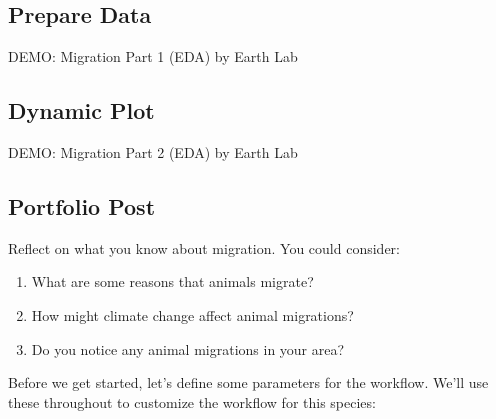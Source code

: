 \documentclass[
  letterpaper,
  DIV=11,
  numbers=noendperiod,
  oneside]{scrreprt}
\providecommand{\tightlist}{%
  \setlength{\itemsep}{0pt}\setlength{\parskip}{0pt}}
\begin{document}
\begin{tcolorbox}[enhanced jigsaw, colbacktitle=quarto-callout-color!10!white, opacityback=0, bottomtitle=1mm, toptitle=1mm, bottomrule=.15mm, left=2mm, colframe=quarto-callout-color-frame, leftrule=.75mm, opacitybacktitle=0.6, colback=white, rightrule=.15mm, toprule=.15mm, breakable, titlerule=0mm, title=\textcolor{quarto-callout-color}{\faInfo}\hspace{0.5em}{Check out our demo video!}, coltitle=black, arc=.35mm]

\subsection{Prepare Data}

DEMO: Migration Part 1 (EDA) by Earth Lab

\subsection{Dynamic Plot}

DEMO: Migration Part 2 (EDA) by Earth Lab

\subsection{Portfolio Post}

\end{tcolorbox}

Reflect on what you know about migration. You could consider:

\begin{enumerate}
\def\labelenumi{\arabic{enumi}.}
\tightlist
\item
  What are some reasons that animals migrate?
\item
  How might climate change affect animal migrations?
\item
  Do you notice any animal migrations in your area?
\end{enumerate}

Before we get started, let's define some parameters for the workflow.
We'll use these throughout to customize the workflow for this species:
\end{document}
